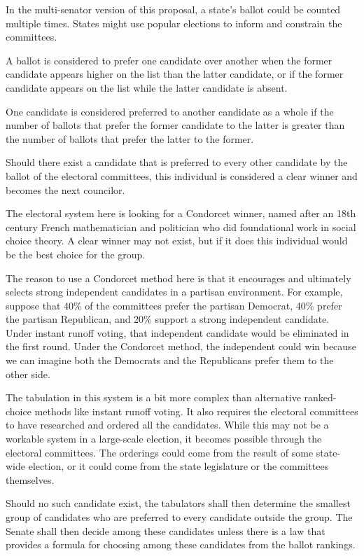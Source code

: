 \documentclass{article}
\begin{document}
In the multi-senator version of this proposal, a state's ballot could be counted multiple times. States might use popular elections to inform and constrain the committees.

\begin{quoting}
A ballot is considered to prefer one candidate over another when the former candidate appears higher on the list than the latter candidate, or if the former candidate appears on the list while the latter candidate is absent.

One candidate is considered preferred to another candidate as a whole if the number of ballots that prefer the former candidate to the latter is greater than the number of ballots that prefer the latter to the former.

Should there exist a candidate that is preferred to every other candidate by the ballot of the electoral committees, this individual is considered a clear winner and becomes the next councilor.
\end{quoting}

The electoral system here is looking for a Condorcet winner, named after an 18th century French mathematician and politician who did foundational work in social choice theory. A clear  winner may not exist, but if it does this individual would be the best choice for the group.

The reason to use a Condorcet method here is that it encourages and ultimately selects strong independent candidates in a partisan environment. For example, suppose that 40\% of the committees prefer the partisan Democrat, 40\% prefer the partisan Republican, and 20\% support a strong independent candidate. Under instant runoff voting, that independent candidate would be eliminated in the first round. Under the Condorcet method, the independent could win because we can imagine both the Democrats and the Republicans prefer them to the other side.

The tabulation in this system is a bit more complex than alternative ranked-choice methods like instant runoff voting. It also requires the electoral committees to have researched and ordered all the candidates. While this may not be a workable system in a large-scale election, it becomes possible through the electoral committees. The orderings could come from the result of some state-wide election, or it could come from the state legislature or the committees themselves.

\begin{quoting}
Should no such candidate exist, the tabulators shall then determine the smallest group of candidates who are preferred to every candidate outside the group. The Senate shall then decide among these candidates unless there is a law that provides a formula for choosing among these candidates from the ballot rankings.
\end{quoting}
\end{document}
